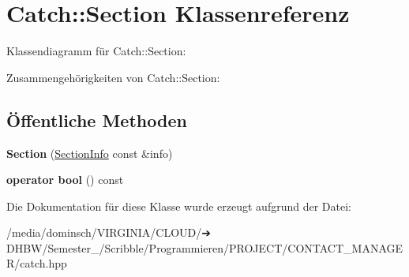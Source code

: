 \hypertarget{classCatch_1_1Section}{}\section{Catch\+:\+:Section Klassenreferenz}
\label{classCatch_1_1Section}


Klassendiagramm für Catch\+:\+:Section\+:


Zusammengehörigkeiten von Catch\+:\+:Section\+:
\subsection*{Öffentliche Methoden}
\begin{DoxyCompactItemize}
\item 
\mbox{\label{classCatch_1_1Section_a68fd4e51e8981aaa7ddb00d8a6abd099}} 
{\bfseries Section} (\hyperlink{structCatch_1_1SectionInfo}{Section\+Info} const \&info)
\item 
\mbox{\label{classCatch_1_1Section_a0632b804dcea1417a2970620a9742eb3}} 
{\bfseries operator bool} () const
\end{DoxyCompactItemize}


Die Dokumentation für diese Klasse wurde erzeugt aufgrund der Datei\+:\begin{DoxyCompactItemize}
\item 
/media/dominsch/\+V\+I\+R\+G\+I\+N\+I\+A/\+C\+L\+O\+U\+D/➔ D\+H\+B\+W/\+Semester\+\_/\+Scribble/\+Programmieren/\+P\+R\+O\+J\+E\+C\+T/\+C\+O\+N\+T\+A\+C\+T\+\_\+\+M\+A\+N\+A\+G\+E\+R/catch.\+hpp\end{DoxyCompactItemize}
